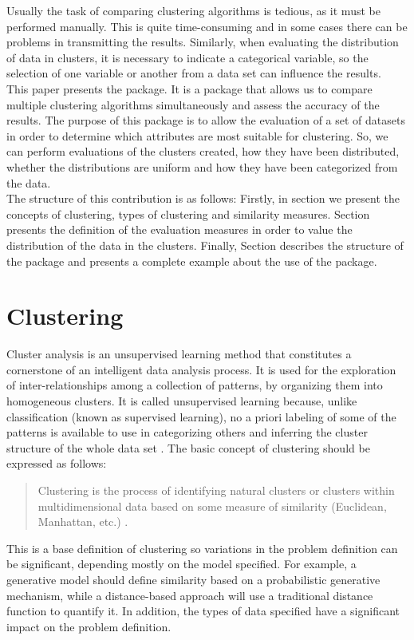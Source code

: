 Usually the task of comparing clustering algorithms is tedious, as it must be performed manually. This is quite time-consuming and in some cases there can be problems in transmitting the results. Similarly, when evaluating the distribution of data in clusters, it is necessary to indicate a categorical variable, so the selection of one variable or another from a data set can influence the results.\\
This paper presents the  package. It is a package that allows us to compare multiple clustering algorithms simultaneously and assess the accuracy of the results. The purpose of this package is to allow the evaluation of a set of datasets in order to determine which attributes are most suitable for clustering. So, we can perform evaluations of the clusters created, how they have been distributed, whether the distributions are uniform and how they have been categorized from the data.\\
The structure of this contribution is as follows: Firstly, in section  we present the concepts of clustering, types of clustering and similarity measures. Section  presents the definition of the evaluation measures in order to value the distribution of the data in the clusters. Finally, Section  describes the structure of the package and presents a complete example about the use of the package.

\section{Clustering} \label{sec:seccion1}

Cluster analysis is an unsupervised learning method that constitutes a cornerstone of an intelligent data analysis process. It is used for the exploration of inter-relationships among a collection of patterns, by organizing them into homogeneous clusters. It is called unsupervised learning because, unlike classification (known as supervised learning), no a priori labeling of some of the patterns is available to use in categorizing others and inferring the cluster structure of the whole data set \citep{R:sotiris-p:2004}. The basic concept of clustering should be expressed as follows:
\\
\begin{quote}
Clustering is the process of identifying natural clusters or clusters within multidimensional data based on some measure of similarity (Euclidean, Manhattan, etc.) \citep{R:mahamed-andries-ayed:2007}.
\end{quote}
This is a base definition of clustering so variations in the problem definition can be significant, depending mostly on the model specified. For example, a generative model should define similarity based on a probabilistic generative mechanism, while a distance-based approach will use a traditional distance function to quantify it. In addition, the types of data specified have a significant impact on the problem definition.

